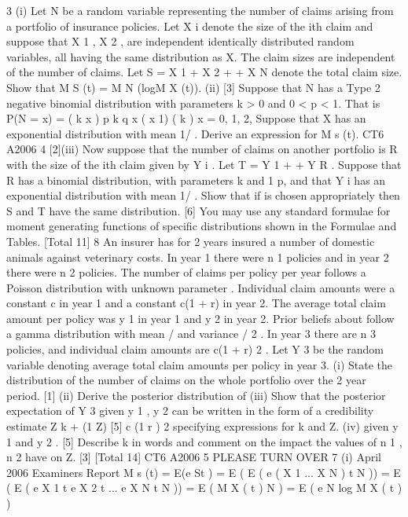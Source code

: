 \documentclass[a4paper,12pt]{article}
\begin{document}
3
(i) Let N be a random variable representing the number of claims arising from a
portfolio of insurance policies. Let X i denote the size of the ith claim and suppose that X 1 , X 2 , are independent identically distributed random variables, all having the same distribution as X. The claim sizes are
independent of the number of claims. Let S = X 1 + X 2 +
+ X N denote the
total claim size. Show that
M S (t) = M N (logM X (t)).
(ii)
[3]
Suppose that N has a Type 2 negative binomial distribution with parameters
k > 0 and 0 < p < 1. That is
P(N = x) =
( k x )
p k q x
( x 1) ( k )
x = 0, 1, 2,
Suppose that X has an exponential distribution with mean 1/ . Derive an
expression for M s (t).
CT6 A2006 4
[2](iii)
Now suppose that the number of claims on another portfolio is R with the size
of the ith claim given by Y i . Let T = Y 1 +
+ Y R . Suppose that R has a
binomial distribution, with parameters k and 1 p, and that Y i has an exponential distribution with mean 1/ . Show that if is chosen appropriately then S and T have the same distribution.
[6]
You may use any standard formulae for moment generating functions of specific distributions shown in the Formulae and Tables.
[Total 11]
8
An insurer has for 2 years insured a number of domestic animals against veterinary costs. In year 1 there were n 1 policies and in year 2 there were n 2 policies. The number of claims per policy per year follows a Poisson distribution with unknown parameter .
Individual claim amounts were a constant c in year 1 and a constant c(1 + r) in year 2.
The average total claim amount per policy was y 1 in year 1 and y 2 in year 2. Prior beliefs about follow a gamma distribution with mean / and variance / 2 . In
year 3 there are n 3 policies, and individual claim amounts are c(1 + r) 2 . Let Y 3 be the random variable denoting average total claim amounts per policy in year 3.
(i) State the distribution of the number of claims on the whole portfolio over the 2 year period.
[1]
(ii) Derive the posterior distribution of
(iii) Show that the posterior expectation of Y 3 given y 1 , y 2 can be written in the form of a credibility estimate
Z
k + (1
Z)
[5]
c (1 r ) 2
specifying expressions for k and Z.
(iv)
given y 1 and y 2 .
[5]
Describe k in words and comment on the impact the values of n 1 , n 2 have
on Z.
[3]
[Total 14]
CT6 A2006 5
PLEASE TURN OVER
7
(i)
April 2006
Examiners Report
M s (t) = E(e St )
= E ( E ( e ( X 1
... X N ) t
N ))
= E ( E ( e X 1 t e X 2 t ... e X N t N ))
= E ( M X ( t ) N )
= E ( e N log M X ( t ) )
\end{document}
